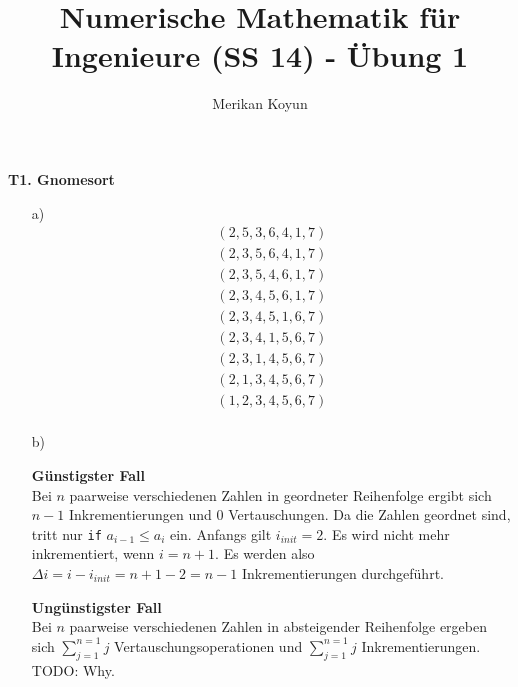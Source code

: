 \documentclass[11pt]{article}
\theoremstyle{plain}
\theoremstyle{definition}
\renewcommand{\u}{\"{u}}
\begin{document}
\title{Numerische Mathematik f\u r Ingenieure (SS 14) - \"{U}bung 1}
\author{Merikan Koyun}
\maketitle

\textbf{T1. Gnomesort}\\
\begin{itemize}
\item[a)]
\begin{align*}
(2, 5, 3, 6, 4, 1, 7)\\
(2, 3, 5, 6, 4, 1, 7)\\
(2, 3, 5, 4, 6, 1, 7)\\
(2, 3, 4, 5, 6, 1, 7)\\
(2, 3, 4, 5, 1, 6, 7)\\
(2, 3, 4, 1, 5, 6, 7)\\
(2, 3, 1, 4, 5, 6, 7)\\
(2, 1, 3, 4, 5, 6, 7)\\
(1, 2, 3, 4, 5, 6, 7)\\
\end{align*}


\item[b)]

\textbf{G\u nstigster Fall}\\
Bei $n$ paarweise verschiedenen Zahlen in geordneter Reihenfolge ergibt sich $n-1$ Inkrementierungen und $0$ Vertauschungen. Da die Zahlen geordnet sind, tritt nur \verb!if! $a_{i-1}\leq a_i$ ein. Anfangs gilt $i_{init}=2$. Es wird nicht mehr inkrementiert, wenn $i=n+1$. Es werden also $\Delta i= i - i_{init}= n+1-2 = n-1$ Inkrementierungen durchgef\u hrt.\vspace{0.3cm}

\textbf{Ung\u nstigster Fall}\\
Bei $n$ paarweise verschiedenen Zahlen in absteigender Reihenfolge ergeben sich $\sum_{j=1}^{n=1} j$ Vertauschungsoperationen und $\sum_{j=1}^{n=1} j$ Inkrementierungen.
TODO: Why.

\end{itemize}
 
\end{document}
